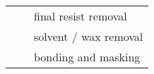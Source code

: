 \documentclass[../main.tex]{subfiles}%
\begin{document}
\begin{table}
\begin{tabu}{ l c l }
             &%
             &%
            final resist removal\\%
             &%
             &%
            solvent / wax removal\\%
             &%
             &%
            bonding and masking\\%
            \bottomrule%
        \end{tabu}%
    \end{table}%
\end{document}

